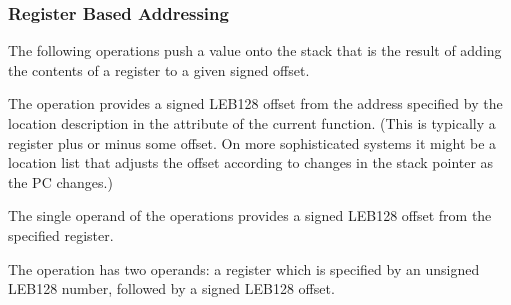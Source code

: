\subsubsection{Register Based Addressing}
\label{chap:registerbasedaddressing}
The following operations push a value onto the stack that is
the result of adding the contents of a register to a given
signed offset.
\begin{enumerate}[1. ]
\itembfnl{\DWOPfbregTARG}
The \DWOPfbregTARG{} operation provides a signed LEB128 offset
from the address specified by the location description in the
\DWATframebase{} attribute of the current function. (This
is typically a  register plus or minus
some offset. On more sophisticated systems it might be a
location list that adjusts the offset according to changes
in the stack pointer as the PC changes.)

\itembfnl{\DWOPbregzeroTARG, \DWOPbregoneTARG, \dots, \DWOPbregthirtyoneTARG}
The single operand of the \DWOPbregnTARG{} 
operations provides
a signed LEB128 offset from
the specified register.

\itembfnl{\DWOPbregxTARG{} }
The \DWOPbregxINDX{} operation has two operands: a register
which is specified by an unsigned LEB128 number, followed by
a signed LEB128 offset.

\end{enumerate}


